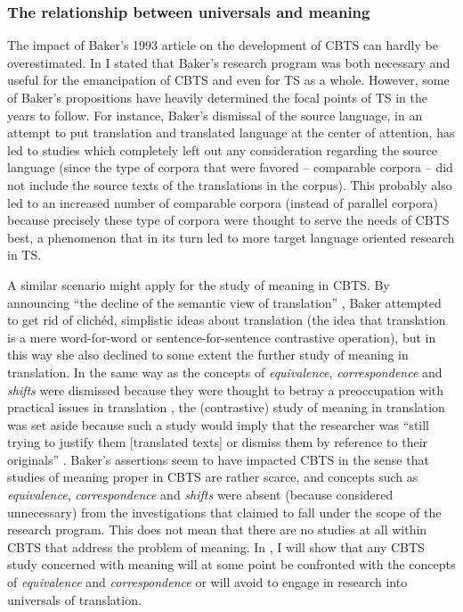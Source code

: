\subsubsection{The relationship between universals and meaning}
\label{sec:2.2.2.6}  
The impact of Baker’s 1993 article on the development of CBTS can hardly be overestimated. In  I stated that Baker’s research program was both necessary and useful for the emancipation of CBTS and even for TS as a whole. However, some of Baker’s propositions have heavily determined the focal points of TS in the years to follow. For instance, Baker’s dismissal of the source language, in an attempt to put translation and translated language at the center of attention, has led to studies which completely left out any consideration regarding the source language (since the type of corpora that were favored – comparable corpora – did not include the source texts of the translations in the corpus). This probably also led to an increased number of comparable corpora (instead of parallel corpora) because precisely these type of corpora were thought to serve the needs of CBTS best, a phenomenon that in its turn led to more target language oriented research in TS.

A similar scenario might apply for the study of meaning in CBTS. By announcing “the decline of the semantic view of translation” \citep[237]{baker_corpus_1993}, Baker attempted to get rid of clichéd, simplistic ideas about translation (the idea that translation is a mere word-for-word or sentence-for-sentence contrastive operation), but in this way she also declined to some extent the further study of meaning in translation. In the same way as the concepts of \textit{equivalence}, \textit{correspondence} and \textit{shifts} were dismissed because they were thought to betray a preoccupation with practical issues in translation \citep[235]{baker_corpus_1993}, the (contrastive) study of meaning in translation was set aside because such a study would imply that the researcher was “still trying to justify them [translated texts] or dismiss them by reference to their originals” \citep[235]{baker_corpus_1993}. Baker’s assertions seem to have impacted CBTS in the sense that studies of meaning proper in CBTS are rather scarce, and concepts such as \textit{equivalence}, \textit{correspondence} and \textit{shifts} were absent (because considered unnecessary) from the investigations that claimed to fall under the scope of the research program. This does not mean that there are no studies at all within CBTS that address the problem of meaning. In , I will show that any CBTS study concerned with meaning will at some point be confronted with the concepts of \textit{equivalence} and \textit{correspondence} or will avoid to engage in research into universals of translation.

